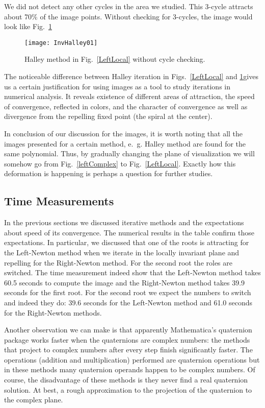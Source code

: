\documentclass{article}
\theoremstyle{definition}
\begin{document}
We did not detect any other cycles in the area we studied. This 3-cycle attracts about 70\% of the image points. Without checking for 3-cycles, the image would look like Fig.~\ref{HalleyInv01}
\begin{figure}
\begin{center}
\texttt{[image: InvHalley01]}
\caption{Halley method in Fig.~\ref{LeftLocal} without cycle checking.}
\label{HalleyInv01}
\end{center}
\end{figure}

The noticeable difference between Halley iteration in  Figs.~\ref{LeftLocal} and \ref{HalleyInv01}gives us a certain justification for using images as a tool to study iterations in numerical analysis. It reveals existence of different areas of attraction, the speed of convergence, reflected in colors, and the character of convergence as well as divergence from the repelling fixed point (the spiral at the center).

In conclusion of our discussion for the images, it is worth noting that all the images presented for a certain method, e.~g. Halley method are found for the same polynomial. Thus, by gradually changing the plane of visualization we will somehow go from Fig.~\ref{leftComplex}  to Fig.~\ref{LeftLocal}. Exactly how this deformation is happening is perhaps a question for further studies.


\subsection{Time Measurements}

In the previous sections we discussed iterative methods and the expectations about speed of its convergence. The numerical results in the table confirm those expectations. In particular, we discussed that one of the roots is attracting for the Left-Newton method when we iterate in the locally invariant plane and repelling for the Right-Newton method. For the second root the roles are switched. The time measurement indeed show  that the Left-Newton method takes 60.5 seconds to compute the image and the Right-Newton method takes 39.9 seconds for the first root.
 For the second root we expect the numbers to switch and indeed they do: 39.6 seconds for the Left-Newton method and 61.0 seconds for the Right-Newton methods.

Another observation we can make is that apparently Mathematica's quaternion package works faster when the quaternions are complex numbers: the methods that project to complex numbers after every step finish significantly faster.  The operations (addition and multiplication) performed are quaternion operations but in these methods many quaternion operands happen to be complex numbers. Of course, the disadvantage of these methods is they never find a real quaternion solution. At best, a rough approximation to the projection of the quaternion to the complex plane.
\end{document}
